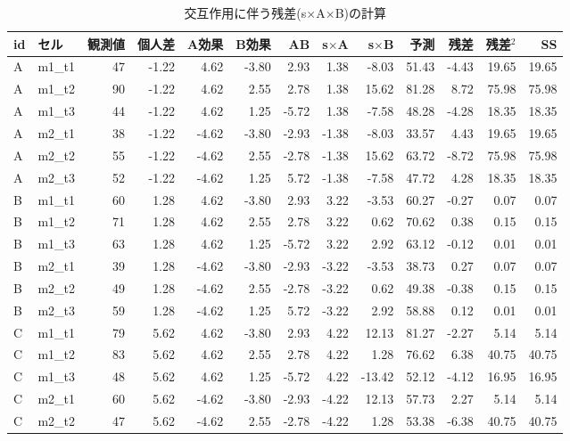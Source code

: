 \documentclass{ltjbook}
\begin{document}
\begin{table}[p]
\centering
	\caption{交互作用に伴う残差(s$\times$A$\times$B)の計算}
	\label{tbl:21_13}
\tiny
\begin{tabular}{llrrrrrrrrrrr}
  \hline
id & セル & 観測値 & 個人差 & A効果 & B効果 & AB & s$\times$A & s$\times$B & 予測 & 残差 & 残差$^2$ & SS \\
  \hline
A & m1\_t1 & 47 & -1.22 & 4.62 & -3.80 & 2.93 & 1.38 & -8.03 & 51.43 & -4.43 & 19.65 & 19.65 \\
A & m1\_t2 & 90 & -1.22 & 4.62 & 2.55 & 2.78 & 1.38 & 15.62 & 81.28 & 8.72 & 75.98 & 75.98 \\
A & m1\_t3 & 44 & -1.22 & 4.62 & 1.25 & -5.72 & 1.38 & -7.58 & 48.28 & -4.28 & 18.35 & 18.35 \\
A & m2\_t1 & 38 & -1.22 & -4.62 & -3.80 & -2.93 & -1.38 & -8.03 & 33.57 & 4.43 & 19.65 & 19.65 \\
A & m2\_t2 & 55 & -1.22 & -4.62 & 2.55 & -2.78 & -1.38 & 15.62 & 63.72 & -8.72 & 75.98 & 75.98 \\
A & m2\_t3 & 52 & -1.22 & -4.62 & 1.25 & 5.72 & -1.38 & -7.58 & 47.72 & 4.28 & 18.35 & 18.35 \\
B & m1\_t1 & 60 & 1.28 & 4.62 & -3.80 & 2.93 & 3.22 & -3.53 & 60.27 & -0.27 & 0.07 & 0.07 \\
B & m1\_t2 & 71 & 1.28 & 4.62 & 2.55 & 2.78 & 3.22 & 0.62 & 70.62 & 0.38 & 0.15 & 0.15 \\
B & m1\_t3 & 63 & 1.28 & 4.62 & 1.25 & -5.72 & 3.22 & 2.92 & 63.12 & -0.12 & 0.01 & 0.01 \\
B & m2\_t1 & 39 & 1.28 & -4.62 & -3.80 & -2.93 & -3.22 & -3.53 & 38.73 & 0.27 & 0.07 & 0.07 \\
B & m2\_t2 & 49 & 1.28 & -4.62 & 2.55 & -2.78 & -3.22 & 0.62 & 49.38 & -0.38 & 0.15 & 0.15 \\
B & m2\_t3 & 59 & 1.28 & -4.62 & 1.25 & 5.72 & -3.22 & 2.92 & 58.88 & 0.12 & 0.01 & 0.01 \\
C & m1\_t1 & 79 & 5.62 & 4.62 & -3.80 & 2.93 & 4.22 & 12.13 & 81.27 & -2.27 & 5.14 & 5.14 \\
C & m1\_t2 & 83 & 5.62 & 4.62 & 2.55 & 2.78 & 4.22 & 1.28 & 76.62 & 6.38 & 40.75 & 40.75 \\
C & m1\_t3 & 48 & 5.62 & 4.62 & 1.25 & -5.72 & 4.22 & -13.42 & 52.12 & -4.12 & 16.95 & 16.95 \\
C & m2\_t1 & 60 & 5.62 & -4.62 & -3.80 & -2.93 & -4.22 & 12.13 & 57.73 & 2.27 & 5.14 & 5.14 \\
C & m2\_t2 & 47 & 5.62 & -4.62 & 2.55 & -2.78 & -4.22 & 1.28 & 53.38 & -6.38 & 40.75 & 40.75 \\

\end{tabular}
\end{table}
\end{document}
